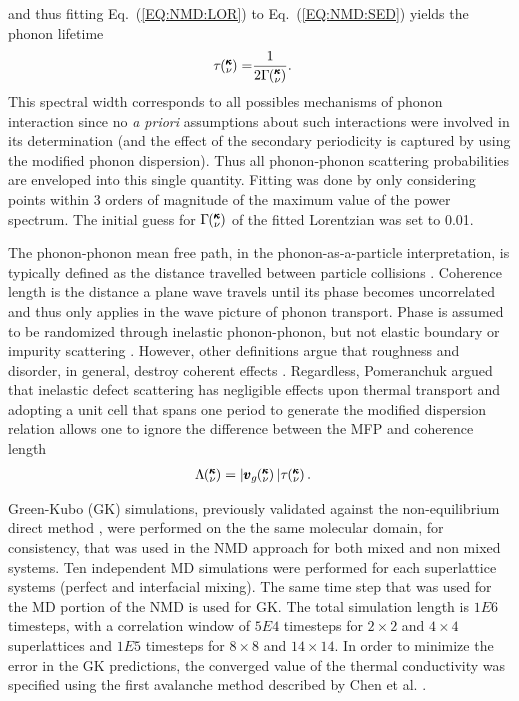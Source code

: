 \documentclass[aps,prb,preprint,preprintnumbers,amsmath,amssymb,floatfix,superscriptaddress]{revtex4}
\newcommand{\kv}{\mspace{-4.0mu}\left(\mspace{-8.0mu}
\begin{smallmatrix}&\pmb{\kappa} \\&\nu\end{smallmatrix}
\mspace{-3.0mu}\right)}
\begin{document}
and thus fitting Eq.~(\ref{EQ:NMD:LOR}) to Eq.~(\ref{EQ:NMD:SED}) yields the phonon lifetime
\begin{equation}\label{EQ:lifetime}
\begin{split}
\tau\kv=&\frac{1}{2\Gamma\kv}.
\end{split}
\end{equation}
This spectral width corresponds to all possibles mechanisms of phonon interaction since no \textit{a priori} assumptions about such interactions were involved in its determination (and the effect of the secondary periodicity is captured by using the modified phonon dispersion). Thus all phonon-phonon scattering probabilities are enveloped into this single quantity. Fitting was done by only considering points within 3 orders of magnitude of the maximum value of the power spectrum. The initial guess for $\Gamma\kv$ of the fitted Lorentzian was set to 0.01.

The phonon-phonon mean free path, in the phonon-as-a-particle interpretation, is typically defined as the distance travelled between particle collisions \cite{ziman_electrons_2001}. Coherence length is the distance a plane wave travels until its phase becomes uncorrelated and thus only applies in the wave picture of phonon transport. Phase is assumed to be randomized through inelastic phonon-phonon, but not elastic boundary or impurity scattering \cite{chen2005nanoscale}. However, other definitions argue that roughness and disorder, in general, destroy coherent effects \cite{PhysRevB.67.195311,dames_682}. Regardless, Pomeranchuk argued that inelastic defect scattering has negligible effects upon thermal transport \cite{pomeranchuk1942thermal} and adopting a unit cell that spans one period to generate the modified dispersion relation allows one to ignore the difference between the MFP and coherence length \cite{PhysRevB.67.195311}
\begin{equation}\label{EQ:M:phonon_mfp}
\begin{split}
\Lambda\kv &= |\pmb{v}_{g}\kv {}| \tau\kv.
\end{split}
\end{equation}


Green-Kubo (GK) simulations, previously validated against the non-equilibrium direct method \cite {PhysRevB.79.075316}, were performed on the the same molecular domain, for consistency, that was used in the NMD approach for both mixed and non mixed systems. Ten independent MD simulations were performed for each superlattice systems (perfect and interfacial mixing). The same time step that was used for the MD portion of the NMD is used for GK. The total  simulation length is $1E6$ timesteps, with a correlation window of $5E4$ timesteps for $2 \times 2$ and $4 \times 4$ superlattices and $1E5$ timesteps for $8 \times 8$ and $14 \times 14$. In order to minimize the error in the GK predictions, the converged value of the thermal conductivity was specified using the first avalanche method described by Chen et al. \cite{Chen20102392}.
\end{document}
